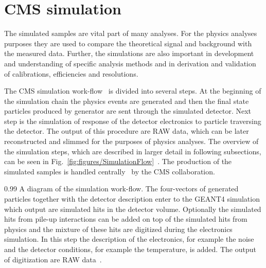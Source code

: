 
\clearpage

\setcounter{secnumdepth}{4}
\setcounter{secnumdepth}{5}


\section{CMS simulation}

The simulated samples are vital part of many analyses. For the physics analyses purposes they are used to compare the theoretical signal and background with the measured data. Further, the simulations are also important in development and understanding of specific analysis methods and in derivation and validation of calibrations, efficiencies and resolutions.

The CMS simulation work-flow~\cite{Banerjee:2007zz, Hildreth:2017vpw, Hildreth:2015kps} is divided into several steps. At the beginning of the simulation chain the physics events are generated and then the final state particles produced by generator are sent through the simulated detector. Next step is the simulation of response of the detector electronics to particle traversing the detector. The output of this procedure are RAW data, which can be later reconstructed and slimmed for the purposes of physics analyses. The overview of the simulation steps, which are described in larger detail in following subsections, can be seen in Fig.~\ref{fig:figures/SimulationFlow}~\cite{website:simuBasics}. The production of the simulated samples is handled centrally~\cite{Boudoul:2015bkp} by the CMS collaboration.

                 {0.99}       %
                 { A diagram of the simulation work-flow. The four-vectors of generated particles together with the detector description enter to the GEANT4 simulation which output are simulated hits in the detector volume. Optionally the simulated hits from pile-up interactions can be added on top of the simulated hits from physics and the mixture of these hits are digitized during the electronics simulation. In this step the description of the electronics, for example the noise and the detector conditions, for example the temperature, is added. The output of digitization are RAW data~\cite{website:simuBasics}. }


